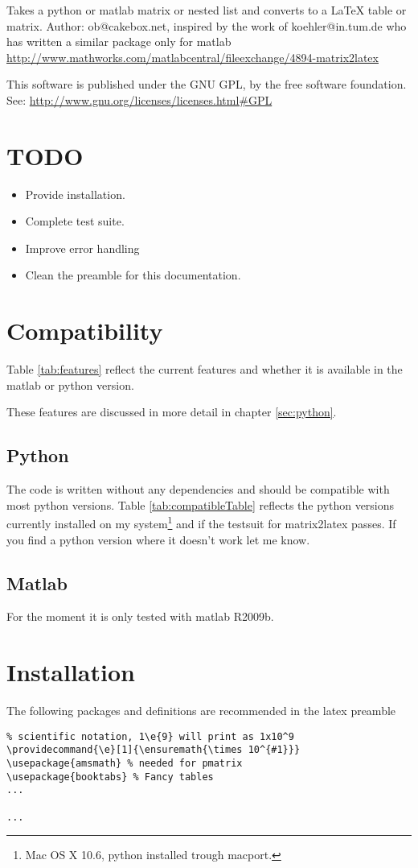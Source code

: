 Takes a python or matlab matrix or nested list and converts to a LaTeX table or matrix.
Author: ob@cakebox.net, inspired by the work of koehler@in.tum.de who has written
a similar package only for matlab
\url{http://www.mathworks.com/matlabcentral/fileexchange/4894-matrix2latex}

This software is published under the GNU GPL, by the free software
foundation. See:
\url{http://www.gnu.org/licenses/licenses.html#GPL}

\section{TODO}
\begin{itemize}
\item Provide installation.
\item Complete test suite.
\item Improve error handling
\item Clean the preamble for this documentation.
\end{itemize}

\section{Compatibility}
Table \ref{tab:features} reflect the current features and whether it is available
in the matlab or python version.

These features are discussed in more detail in chapter \ref{sec:python}.

\subsection{Python}
The code is written without any dependencies and should be compatible with most python versions.
Table \ref{tab:compatibleTable} reflects the python versions currently installed
on my system\footnote{Mac OS X 10.6, python installed trough macport.}
and if the testsuit for matrix2latex passes. If you find a python version where
it doesn't work let me know.

\subsection{Matlab}
For the moment it is only tested with matlab R2009b.

\section{Installation}
The following packages and definitions are recommended in the latex preamble 
\begin{verbatim}
% scientific notation, 1\e{9} will print as 1x10^9
\providecommand{\e}[1]{\ensuremath{\times 10^{#1}}}
\usepackage{amsmath} % needed for pmatrix
\usepackage{booktabs} % Fancy tables
...

...
\end{verbatim}
